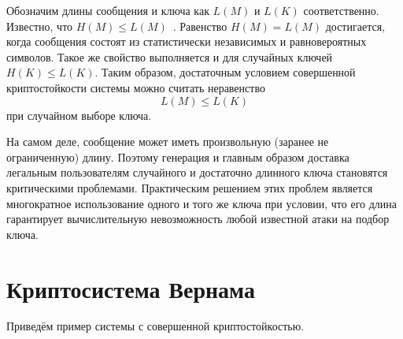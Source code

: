 

Обозначим длины сообщения и ключа как $L(M)$ и $L(K)$ соответственно. Известно, что $H(M) \leq L(M)$~\cite{GabPil:2007}. Равенство $H(M) = L(M)$ достигается, когда сообщения состоят из статистически независимых и равновероятных символов. Такое же свойство выполняется и для случайных ключей $H(K) \leq L(K)$. Таким образом, достаточным условием совершенной криптостойкости системы можно считать неравенство
 \[ L(M) \leq L(K)\]
при случайном выборе ключа.


На самом деле, сообщение может иметь произвольную (заранее не ограниченную) длину. Поэтому генерация и главным образом доставка легальным пользователям случайного и достаточно длинного ключа становятся критическими проблемами. Практическим решением этих проблем является многократное использование одного и того же ключа при условии, что его длина гарантирует вычислительную невозможность любой известной атаки на подбор ключа.


\section{Криптосистема Вернама}

Приведём пример системы с совершенной криптостойкостью.

